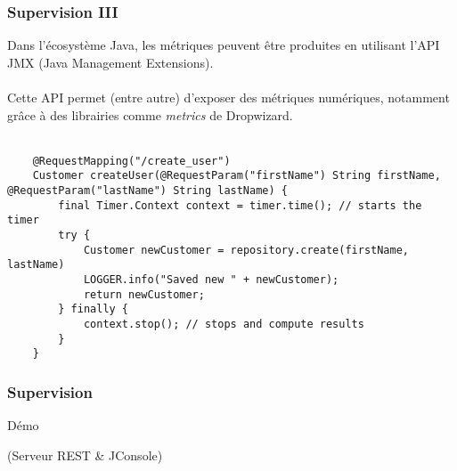 \begin{frame}[fragile]
	\frametitle{Supervision III}
Dans l'\'{e}cosyst\`{e}me Java, les m\'{e}triques peuvent \^{e}tre produites en utilisant l'API JMX (Java Management Extensions).
    \\~\\
    Cette API permet (entre autre) d'exposer des m\'{e}triques num\'{e}riques, notamment gr\^{a}ce \`{a} des librairies comme \textit{metrics} de Dropwizard.
    \\~\\
        \begin{lstlisting}
	@RequestMapping("/create_user")
	Customer createUser(@RequestParam("firstName") String firstName, @RequestParam("lastName") String lastName) {
		final Timer.Context context = timer.time(); // starts the timer
		try {
			Customer newCustomer = repository.create(firstName, lastName)
			LOGGER.info("Saved new " + newCustomer);
			return newCustomer;
		} finally {
			context.stop(); // stops and compute results
		}
	}
	\end{lstlisting}
\end{frame}

\begin{frame}
	\frametitle{Supervision}
    \begin{center}
    \fontsize{48pt}{7.2}\selectfont
    D\'{e}mo
    \end{center}
    \begin{center}
    (Serveur REST \& JConsole)
    \end{center}
\end{frame}
